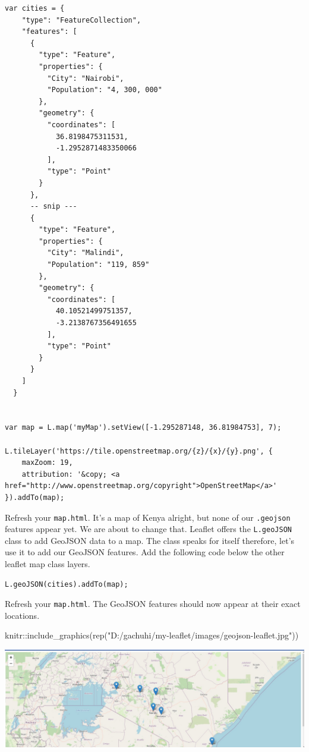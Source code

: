 \documentclass[
]{book}
\newenvironment{Shaded}{\begin{snugshade}}{\end{snugshade}}
\newcommand{\FunctionTok}[1]{\textcolor[rgb]{0.00,0.00,0.00}{#1}}
\newcommand{\NormalTok}[1]{#1}
\newcommand{\SpecialCharTok}[1]{\textcolor[rgb]{0.00,0.00,0.00}{#1}}
\newcommand{\StringTok}[1]{\textcolor[rgb]{0.31,0.60,0.02}{#1}}
\begin{document}
\begin{verbatim}
var cities = {
    "type": "FeatureCollection",
    "features": [
      {
        "type": "Feature",
        "properties": {
          "City": "Nairobi",
          "Population": "4, 300, 000"
        },
        "geometry": {
          "coordinates": [
            36.8198475311531,
            -1.2952871483350066
          ],
          "type": "Point"
        }
      },
      -- snip ---
      {
        "type": "Feature",
        "properties": {
          "City": "Malindi",
          "Population": "119, 859"
        },
        "geometry": {
          "coordinates": [
            40.10521499751357,
            -3.2138767356491655
          ],
          "type": "Point"
        }
      }
    ]
  }


var map = L.map('myMap').setView([-1.295287148, 36.81984753], 7);

L.tileLayer('https://tile.openstreetmap.org/{z}/{x}/{y}.png', {
    maxZoom: 19,
    attribution: '&copy; <a href="http://www.openstreetmap.org/copyright">OpenStreetMap</a>'
}).addTo(map);
\end{verbatim}

Refresh your \texttt{map.html}. It's a map of Kenya alright, but none of our \texttt{.geojson} features appear yet. We are about to change that. Leaflet offers the \texttt{L.geoJSON} class to add GeoJSON data to a map. The class speaks for itself therefore, let's use it to add our GeoJSON features. Add the following code below the other leaflet map class layers.

\begin{verbatim}
L.geoJSON(cities).addTo(map);
\end{verbatim}

Refresh your \texttt{map.html}. The GeoJSON features should now appear at their exact locations.

\begin{Shaded}
\begin{Highlighting}[]
\NormalTok{knitr}\SpecialCharTok{::}\FunctionTok{include\_graphics}\NormalTok{(}\FunctionTok{rep}\NormalTok{(}\StringTok{"D:/gachuhi/my{-}leaflet/images/geojson{-}leaflet.jpg"}\NormalTok{))}
\end{Highlighting}
\end{Shaded}

\includegraphics[width=26.46in]{../images/geojson-leaflet}
\end{document}
